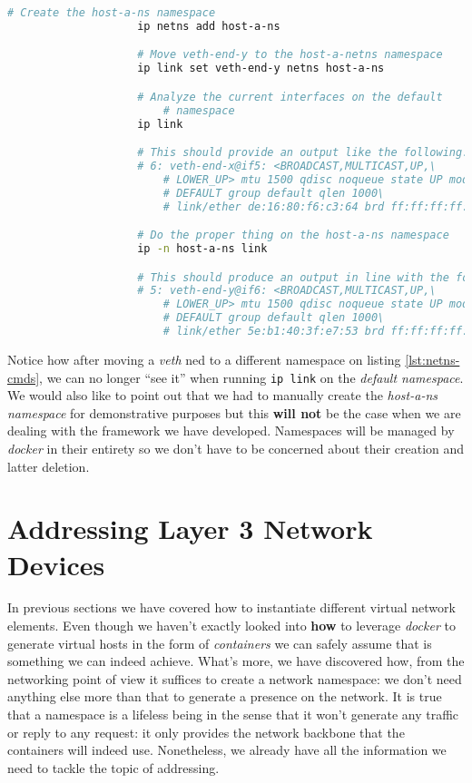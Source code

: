                 \begin{lstlisting}[language = bash, caption = Running \texttt{ip} on a Different Namespace., label = lst:netns-cmds]
                    # Create the host-a-ns namespace
                    ip netns add host-a-ns

                    # Move veth-end-y to the host-a-netns namespace
                    ip link set veth-end-y netns host-a-ns

                    # Analyze the current interfaces on the default
                        # namespace
                    ip link

                    # This should provide an output like the following:
                    # 6: veth-end-x@if5: <BROADCAST,MULTICAST,UP,\
                        # LOWER_UP> mtu 1500 qdisc noqueue state UP mode\
                        # DEFAULT group default qlen 1000\
                        # link/ether de:16:80:f6:c3:64 brd ff:ff:ff:ff:ff:ff

                    # Do the proper thing on the host-a-ns namespace
                    ip -n host-a-ns link

                    # This should produce an output in line with the following:
                    # 5: veth-end-y@if6: <BROADCAST,MULTICAST,UP,\
                        # LOWER_UP> mtu 1500 qdisc noqueue state UP mode\
                        # DEFAULT group default qlen 1000\
                        # link/ether 5e:b1:40:3f:e7:53 brd ff:ff:ff:ff:ff:ff
                \end{lstlisting}

                Notice how after moving a \textit{veth} ned to a different namespace on listing \ref{lst:netns-cmds}, we can no longer ``see it'' when running \texttt{ip link} on the \textit{default namespace}. We would also like to point out that we had to manually create the \textit{host-a-ns namespace} for demonstrative purposes but this \textbf{will not} be the case when we are dealing with the framework we have developed. Namespaces will be managed by \textit{docker} in their entirety so we don't have to be concerned about their creation and latter deletion.\\

    \section{Addressing Layer 3 Network Devices}
        In previous sections we have covered how to instantiate different virtual network elements. Even though we haven't exactly looked into \textbf{how} to leverage \textit{docker} to generate virtual hosts in the form of \textit{containers} we can safely assume that is something we can indeed achieve. What's more, we have discovered how, from the networking point of view it suffices to create a network namespace: we don't need anything else more than that to generate a presence on the network. It is true that a namespace is a lifeless being in the sense that it won't generate any traffic or reply to any request: it only provides the network backbone that the containers will indeed use. Nonetheless, we already have all the information we need to tackle the topic of addressing.\\

